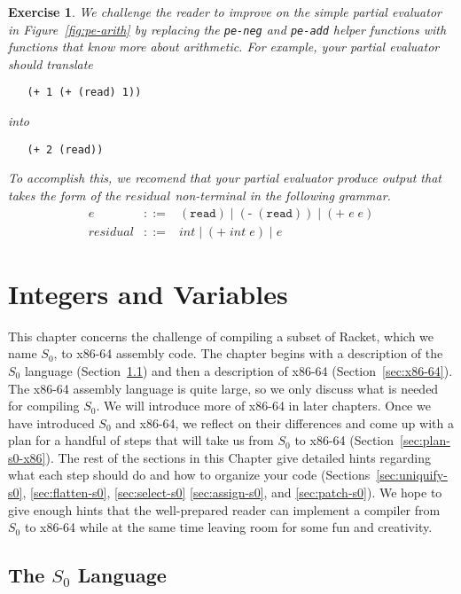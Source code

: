 \documentclass[12pt]{book}
\newtheorem{exercise}[theorem]{Exercise}
\newcommand{\itm}[1]{\ensuremath{\mathit{#1}}}
\newcommand{\Int}{\itm{int}}
\newcommand{\key}[1]{\texttt{#1}}
\begin{document}
\begin{exercise}
We challenge the reader to improve on the simple partial evaluator in
Figure~\ref{fig:pe-arith} by replacing the \texttt{pe-neg} and
\texttt{pe-add} helper functions with functions that know more about
arithmetic. For example, your partial evaluator should translate
\begin{lstlisting}
   (+ 1 (+ (read) 1))
\end{lstlisting}
into
\begin{lstlisting}
   (+ 2 (read))
\end{lstlisting}
To accomplish this, we recomend that your partial evaluator produce
output that takes the form of the $\itm{residual}$ non-terminal in the
following grammar.
\[
\begin{array}{lcl}
e &::=& (\key{read}) \mid (\key{-} \;(\key{read})) \mid (\key{+} \;e\; e)\\
\itm{residual} &::=& \Int \mid (\key{+}\; \Int\; e) \mid e
\end{array}
\]
\end{exercise}


\chapter{Integers and Variables}
\label{ch:int-exp}

This chapter concerns the challenge of compiling a subset of Racket,
which we name $S_0$, to x86-64 assembly code. The chapter begins with
a description of the $S_0$ language (Section~\ref{sec:s0}) and then a
description of x86-64 (Section~\ref{sec:x86-64}). The x86-64 assembly
language is quite large, so we only discuss what is needed for
compiling $S_0$. We will introduce more of x86-64 in later
chapters. Once we have introduced $S_0$ and x86-64, we reflect on
their differences and come up with a plan for a handful of steps that
will take us from $S_0$ to x86-64 (Section~\ref{sec:plan-s0-x86}).
The rest of the sections in this Chapter give detailed hints regarding
what each step should do and how to organize your code
(Sections~\ref{sec:uniquify-s0}, \ref{sec:flatten-s0},
\ref{sec:select-s0} \ref{sec:assign-s0}, and \ref{sec:patch-s0}).  We
hope to give enough hints that the well-prepared reader can implement
a compiler from $S_0$ to x86-64 while at the same time leaving room
for some fun and creativity.

\section{The $S_0$ Language}
\label{sec:s0}
\end{document}
